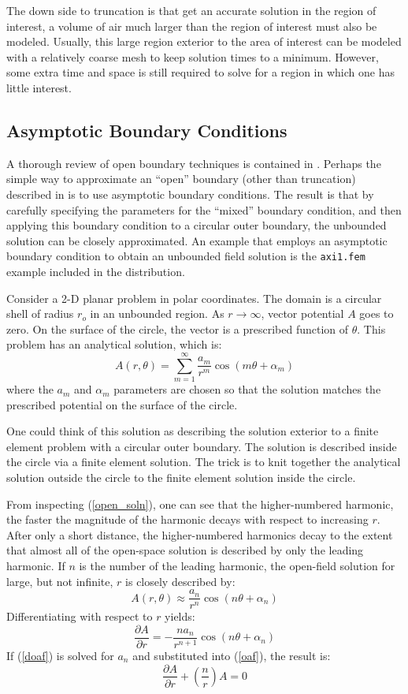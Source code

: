 \documentclass[12pt]{report}
\newcommand{\be}{\begin{equation}}
\newcommand{\ee}{\end{equation}}
\begin{document}
The down side to truncation is that get an accurate solution in the
region of interest, a volume of air much larger than the region of
interest must also be modeled.  Usually, this large region exterior
to the area of interest can be modeled with a relatively coarse
mesh to keep solution times to a minimum.  However, some extra time
and space is still required to solve for a region in which one has
little interest.

\subsection{Asymptotic Boundary Conditions}
A thorough review of open boundary techniques is contained in
\cite{chen}.  Perhaps the simple way to approximate an ``open''
boundary (other than truncation) described in \cite{chen} is to use
asymptotic boundary conditions.  The result is that by carefully
specifying the parameters for the ``mixed'' boundary condition, and
then applying this boundary condition to a circular outer boundary,
the unbounded solution can be closely approximated.  An example
that employs an asymptotic boundary condition to obtain an
unbounded field solution is the {\tt axi1.fem} example included in
the distribution.

Consider a 2-D planar problem in polar coordinates.  The domain is
a circular shell of radius $r_o$ in an unbounded region.  As $r
\rightarrow
\infty$, vector potential $A$ goes to zero.  On the surface of the
circle, the vector is a prescribed function of $\theta$.  This
problem has an analytical solution, which is:
\be \label{open_soln} A(r,\theta)=\sum_{m=1}^\infty \frac{a_m}{r^m} \cos (m \theta +
\alpha_m) \ee
where the $a_m$ and $\alpha_m$ parameters are chosen so that the
solution matches the prescribed potential on the surface of the
circle.

One could think of this solution as describing the solution
exterior to a finite element problem with a circular outer
boundary.  The solution is described inside the circle via a finite
element solution.  The trick is to knit together the analytical
solution outside the circle to the finite element solution inside
the circle.

From inspecting (\ref{open_soln}), one can see that the
higher-numbered harmonic, the faster the magnitude of the harmonic
decays with respect to increasing $r$.  After only a short
distance, the higher-numbered harmonics decay to the extent that
almost all of the open-space solution is described by only the
leading harmonic.  If $n$ is the number of the leading harmonic,
the open-field solution for large, but not infinite, $r$ is closely
described by:
\be \label{oaf} A(r,\theta) \approx \frac{a_n}{r^n} \cos (n \theta + \alpha_n) \ee
Differentiating with respect to $r$ yields:
\be \label{doaf} \frac{\partial A}{\partial r} = - \frac{n
a_n}{r^{n+1}} \cos (n \theta + \alpha_n) \ee
 If (\ref{doaf}) is solved for $a_n$ and substituted into
(\ref{oaf}), the result is:
\be \label{open_bc}  \frac{\partial A}{\partial r} +
\left(\frac{n}{r} \right) A = 0 \ee
\end{document}
